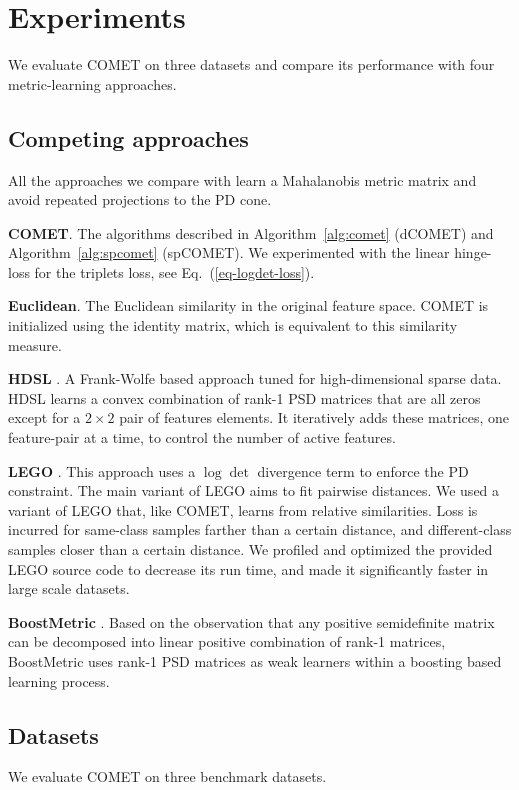 \documentclass[twoside,11pt]{article}
\renewcommand{\eqref}[1]{Eq.~(\ref{#1})}
\begin{document}

\section{Experiments}
We evaluate COMET on three datasets and compare its performance with four metric-learning approaches. 

\subsection{Competing approaches}
All the approaches we compare with learn a Mahalanobis metric matrix and avoid repeated projections to the PD cone.

\textbf{COMET}. The algorithms described in Algorithm~\ref{alg:comet} (dCOMET) and Algorithm~\ref{alg:spcomet} (spCOMET). We experimented with the linear hinge-loss for the triplets loss, see \eqref{eq-logdet-loss}.

\textbf{Euclidean}. The Euclidean similarity in the original feature space. COMET is initialized using the identity matrix, which is equivalent to this similarity measure.

\textbf{HDSL} \citep{HDSL}. A Frank-Wolfe based approach tuned for high-dimensional sparse data. HDSL learns a convex combination of rank-1 PSD matrices that are all zeros except for a $2\times2$ pair of features elements. It iteratively adds these matrices, one feature-pair at a time, to control the number of active features.

\textbf{LEGO} \citep{lego}. This approach uses a $\log \det$ divergence term to enforce the PD constraint. The main variant of LEGO aims to fit pairwise distances. We used a variant of LEGO that, like COMET, learns from relative similarities. Loss is incurred for same-class samples farther than a certain distance, and different-class samples closer than a certain distance. We profiled and optimized the provided LEGO source code to decrease its run time, and made it significantly faster in large scale datasets.

\noindent\textbf{BoostMetric} \citep{boost}. Based on the observation that any positive semidefinite matrix can be decomposed into linear positive combination of rank-1 matrices, BoostMetric uses rank-1 PSD matrices as weak learners within a boosting based learning process.

\subsection{Datasets}
We evaluate COMET on three benchmark datasets.
\end{document}
